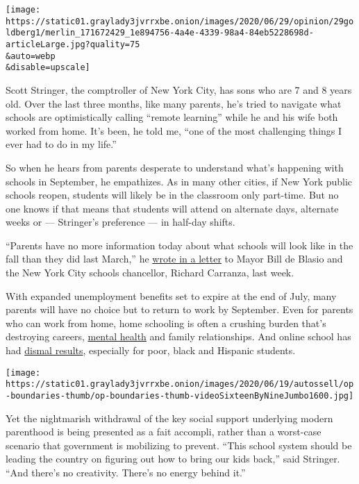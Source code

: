 \texttt{[image: https://static01.graylady3jvrrxbe.onion/images/2020/06/29/opinion/29goldberg1/merlin\_171672429\_1e894756-4a4e-4339-98a4-84eb5228698d-articleLarge.jpg?quality=75\\\&auto=webp\\\&disable=upscale]}

Scott Stringer, the comptroller of New York City, has sons who are 7 and
8 years old. Over the last three months, like many parents, he's tried
to navigate what schools are optimistically calling ``remote learning''
while he and his wife both worked from home. It's been, he told me,
``one of the most challenging things I ever had to do in my life.''

So when he hears from parents desperate to understand what's happening
with schools in September, he empathizes. As in many other cities, if
New York public schools reopen, students will likely be in the classroom
only part-time. But no one knows if that means that students will attend
on alternate days, alternate weeks or --- Stringer's preference --- in
half-day shifts.

``Parents have no more information today about what schools will look
like in the fall than they did last March,'' he
\href{https://comptroller.nyc.gov/wp-content/uploads/2020/06/6.26.20-Letter-to-Mayor-de-Blasio-and-Chancellor-Carranza.pdf?utm_source=Media-All\&utm_campaign=5d9c0fee2b-EMAIL_CAMPAIGN_2017_05_31_COPY_01\&utm_medium=email\&utm_term=0_7cd514b03e-5d9c0fee2b-\&utm_source=Media-All\&utm_campaign=5d9c0fee2b-EMAIL_CAMPAIGN_2017_05_31_COPY_01\&utm_medium=email\&utm_term=0_7cd514b03e-5d9c0fee2b-154094945}{wrote
in a letter} to Mayor Bill de Blasio and the New York City schools
chancellor, Richard Carranza, last week.

With expanded unemployment benefits set to expire at the end of July,
many parents will have no choice but to return to work by September.
Even for parents who can work from home, home schooling is often a
crushing burden that's destroying careers,
\href{https://www.nytimes3xbfgragh.onion/2020/06/23/parenting/parental-burnout-coronavirus.html}{mental
health} and family relationships. And online school has had
\href{https://www.nytimes3xbfgragh.onion/2020/06/05/us/coronavirus-education-lost-learning.html}{dismal
results}, especially for poor, black and Hispanic students.

\texttt{[image: https://static01.graylady3jvrrxbe.onion/images/2020/06/19/autossell/op-boundaries-thumb/op-boundaries-thumb-videoSixteenByNineJumbo1600.jpg]}

Yet the nightmarish withdrawal of the key social support underlying
modern parenthood is being presented as a fait accompli, rather than a
worst-case scenario that government is mobilizing to prevent. ``This
school system should be leading the country on figuring out how to bring
our kids back,'' said Stringer. ``And there's no creativity. There's no
energy behind it.''

